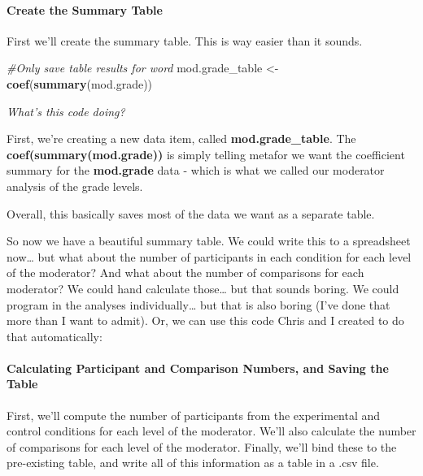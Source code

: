 \documentclass[
]{book}
\newenvironment{Shaded}{\begin{snugshade}}{\end{snugshade}}
\newcommand{\CommentTok}[1]{\textcolor[rgb]{0.56,0.35,0.01}{\textit{#1}}}
\newcommand{\FunctionTok}[1]{\textcolor[rgb]{0.13,0.29,0.53}{\textbf{#1}}}
\newcommand{\NormalTok}[1]{#1}
\newcommand{\OtherTok}[1]{\textcolor[rgb]{0.56,0.35,0.01}{#1}}
\begin{document}
\hypertarget{create-the-summary-table-1}{%
\paragraph{Create the Summary Table}\label{create-the-summary-table-1}}

First we'll create the summary table. This is way easier than it sounds.

\begin{Shaded}
\begin{Highlighting}[]
\CommentTok{\#Only save table results for word }
\NormalTok{mod.grade\_table }\OtherTok{\textless{}{-}}\FunctionTok{coef}\NormalTok{(}\FunctionTok{summary}\NormalTok{(mod.grade))}
\end{Highlighting}
\end{Shaded}

\emph{What's this code doing?}

First, we're creating a new data item, called \textbf{mod.grade\_table}. The \textbf{coef(summary(mod.grade))} is simply telling metafor we want the coefficient summary for the \textbf{mod.grade} data - which is what we called our moderator analysis of the grade levels.

Overall, this basically saves most of the data we want as a separate table.

So now we have a beautiful summary table. We could write this to a spreadsheet now\ldots{} but what about the number of participants in each condition for each level of the moderator? And what about the number of comparisons for each moderator? We could hand calculate those\ldots{} but that sounds boring. We could program in the analyses individually\ldots{} but that is also boring (I've done that more than I want to admit). Or, we can use this code Chris and I created to do that automatically:

\hypertarget{calculating-participant-and-comparison-numbers-and-saving-the-table-1}{%
\paragraph{Calculating Participant and Comparison Numbers, and Saving the Table}\label{calculating-participant-and-comparison-numbers-and-saving-the-table-1}}

First, we'll compute the number of participants from the experimental and control conditions for each level of the moderator. We'll also calculate the number of comparisons for each level of the moderator. Finally, we'll bind these to the pre-existing table, and write all of this information as a table in a .csv file.
\end{document}
